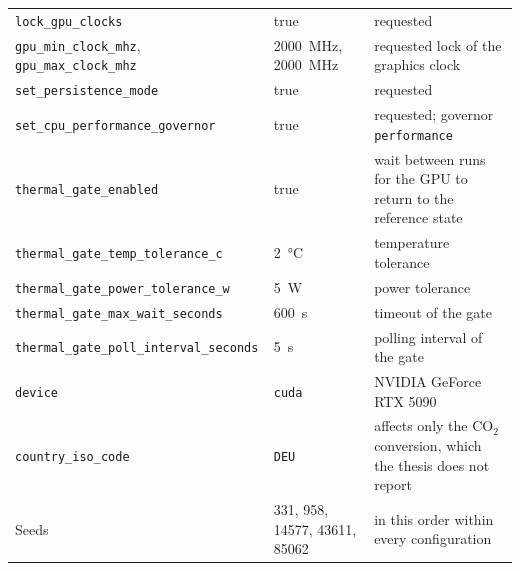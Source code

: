 \begin{table}[tbp]
\begin{tabular}{@{}p{4.7cm}p{3.7cm}p{5.0cm}@{}}
    \texttt{lock\_\allowbreak gpu\_\allowbreak clocks}                                           & true                           & requested                                                \\
    \texttt{gpu\_\allowbreak min\_\allowbreak clock\_\allowbreak mhz}, \texttt{gpu\_\allowbreak max\_\allowbreak clock\_\allowbreak mhz}         & \SI{2000}{\mega\hertz}, \SI{2000}{\mega\hertz} & requested lock of the graphics clock               \\
    \texttt{set\_\allowbreak persistence\_\allowbreak mode}                                      & true                           & requested                                                \\
    \texttt{set\_\allowbreak cpu\_\allowbreak performance\_\allowbreak governor}                             & true                           & requested; governor \texttt{performance}                \\
    \texttt{thermal\_\allowbreak gate\_\allowbreak enabled}                                      & true                           & wait between runs for the GPU to return to the reference state \\
    \texttt{thermal\_\allowbreak gate\_\allowbreak temp\_\allowbreak tolerance\_\allowbreak c}                           & \SI{2}{\celsius}               & temperature tolerance                                    \\
    \texttt{thermal\_\allowbreak gate\_\allowbreak power\_\allowbreak tolerance\_\allowbreak w}                          & \SI{5}{\watt}                  & power tolerance                                          \\
    \texttt{thermal\_\allowbreak gate\_\allowbreak max\_\allowbreak wait\_\allowbreak seconds}                           & \SI{600}{\second}              & timeout of the gate                                      \\
    \texttt{thermal\_\allowbreak gate\_\allowbreak poll\_\allowbreak interval\_\allowbreak seconds}                      & \SI{5}{\second}                & polling interval of the gate                             \\
    \texttt{device}                                                      & \texttt{cuda}                  & NVIDIA GeForce RTX 5090                                  \\
    \texttt{country\_\allowbreak iso\_\allowbreak code}                                          & \texttt{DEU}                   & affects only the CO$_2$ conversion, which the thesis does not report \\
    Seeds                                                                & \num{331}, \num{958}, \num{14577}, \num{43611}, \num{85062} & in this order within every configuration          \\
    \bottomrule
  \end{tabular}
\end{table}


